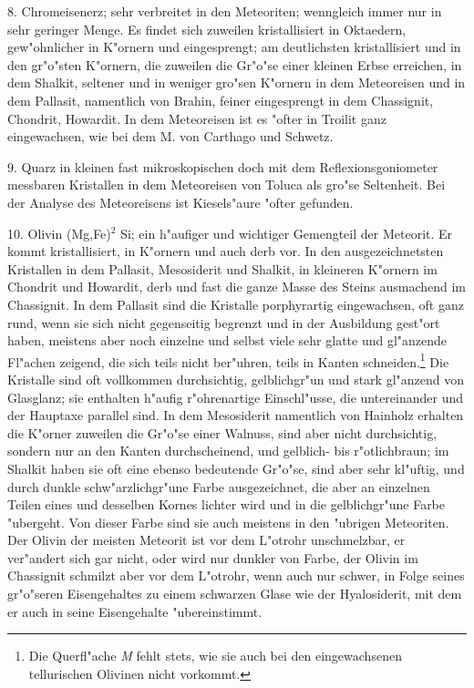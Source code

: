 \documentclass[a4paper, 11pt, oneside, german]{article}
\begin{document}
8. Chromeisenerz; sehr verbreitet in den Meteoriten; wenngleich immer nur in sehr geringer Menge. Es findet sich zuweilen kristallisiert in Oktaedern, gew"ohnlicher in K"ornern und eingesprengt; am deutlichsten kristallisiert und in den gr"o"sten K"ornern, die zuweilen die Gr"o"se einer kleinen Erbse erreichen, in dem Shalkit, seltener und in weniger gro"sen K"ornern in dem Meteoreisen und in dem Pallasit, namentlich von Brahin, feiner eingesprengt in dem Chassignit, Chondrit, Howardit. In dem Meteoreisen ist es "ofter in Troilit ganz eingewachsen, wie bei dem M. von Carthago und Schwetz.

9. Quarz in kleinen fast mikroskopischen doch mit dem Reflexionsgoniometer messbaren Kristallen in dem Meteoreisen von Toluca als gro"se Seltenheit. Bei der Analyse des Meteoreisens ist Kiesels"aure "ofter gefunden.

10. Olivin (Mg,Fe)$^{2}$ Si; ein h"aufiger und wichtiger Gemengteil der Meteorit. Er kommt kristallisiert, in K"ornern und auch derb vor. In den ausgezeichnetsten Kristallen in dem Pallasit, Mesosiderit und Shalkit, in kleineren K"ornern im Chondrit und Howardit, derb und fast die ganze Masse des Steins ausmachend im Chassignit. In dem Pallasit sind die Kristalle porphyrartig eingewachsen, oft ganz rund, wenn sie sich nicht gegenseitig begrenzt und in der Ausbildung gest"ort haben, meistens aber noch einzelne und selbst viele sehr glatte und gl"anzende Fl"achen zeigend, die sich teils nicht ber"uhren, teils in Kanten schneiden.\footnote{Die Querfl"ache \emph{M} fehlt stets, wie sie auch bei den eingewachsenen tellurischen Olivinen nicht vorkommt.} Die Kristalle sind oft vollkommen durchsichtig, gelblichgr"un und stark gl"anzend von Glasglanz; sie enthalten h"aufig r"ohrenartige Einschl"usse, die untereinander und der Hauptaxe parallel sind. In dem Mesosiderit namentlich von Hainholz erhalten die K"orner zuweilen die Gr"o"se einer Walnuss, sind aber nicht durchsichtig, sondern nur an den Kanten durchscheinend, und gelblich- bis r"otlichbraun; im Shalkit haben sie oft eine ebenso bedeutende Gr"o"se, sind aber sehr kl"uftig, und durch dunkle schw"arzlichgr"une Farbe ausgezeichnet, die aber an einzelnen Teilen eines und desselben Kornes lichter wird und in die gelblichgr"une Farbe "ubergeht. Von dieser Farbe sind sie auch meistens in den "ubrigen Meteoriten. Der Olivin der meisten Meteorit ist vor dem L"otrohr unschmelzbar, er ver"andert sich gar nicht, oder wird nur dunkler von Farbe, der Olivin im Chassignit schmilzt aber vor dem L"otrohr, wenn auch nur schwer, in Folge seines gr"o"seren Eisengehaltes zu einem schwarzen Glase wie der Hyalosiderit, mit dem er auch in seine Eisengehalte "ubereinstimmt.
\end{document}
